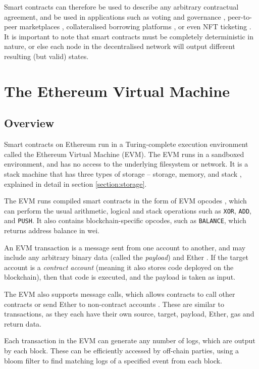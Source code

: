 Smart contracts can therefore be used to describe any arbitrary contractual agreement,
and be used in applications such as voting and governance \cite{ethdao}, 
peer-to-peer marketplaces \cite{opensea}, 
collateralised borrowing platforms \cite{aave} \cite{compound}, or even NFT ticketing \cite{getprotocol} \cite{tkets}.
It is important to note that smart contracts must be completely deterministic in nature, 
or else each node in the decentralised network will output different resulting (but valid) states.

\section{The Ethereum Virtual Machine}

\subsection{Overview}

Smart contracts on Ethereum run in a Turing-complete execution environment called the
Ethereum Virtual Machine (EVM). The EVM runs in a sandboxed environment, and has no access
to the underlying filesystem or network. It is a stack machine that has three types of
storage -- storage, memory, and stack \cite{ethevm}, explained in detail in section \ref{section:storage}.

The EVM runs compiled smart contracts in the form of EVM opcodes \cite{solidityevm}, which can perform
the usual arithmetic, logical and stack operations such as \texttt{XOR}, \texttt{ADD}, and 
\texttt{PUSH}. It also contains blockchain-specific opcodes, such as \texttt{BALANCE}, 
which returns address balance in wei.

An EVM transaction is a message sent from one account to another, and may include any
arbitrary binary data (called the \textit{payload}) and Ether \cite{solidityevm}. If the
target account is a \textit{contract account} (meaning it also stores code deployed on
the blockchain), then that code is executed, and the payload is taken as input.

The EVM also supports message calls, which allows contracts to call other contracts or
send Ether to non-contract accounts \cite{solidityevm}. These are similar to transactions, 
as they each have their own source, target, payload, Ether, gas and return data.

Each transaction in the EVM can generate any number of logs, which are output by each block.
These can be efficiently accessed by off-chain parties, using a bloom filter to find matching
logs of a specified event from each block.

